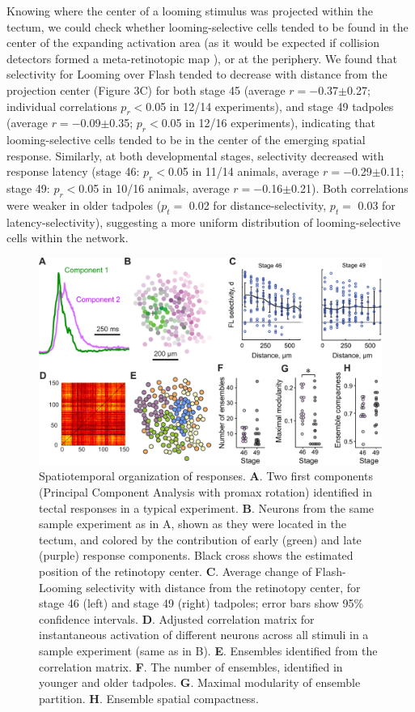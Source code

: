 \documentclass{article}
\begin{document}
Knowing where the center of a looming stimulus was projected within the tectum, we could check whether looming-selective cells tended to be found in the center of the expanding activation area (as it would be expected if collision detectors formed a meta-retinotopic map \citep{frost2004review}), or at the periphery. We found that selectivity for Looming over Flash tended to decrease with distance from the projection center (Figure 3C) for both stage 45 (average $r=-$0.37$\pm$0.27; individual correlations $p_r<$0.05 in 12/14 experiments), and stage 49 tadpoles (average $r=-$0.09$\pm$0.35; $p_r<$0.05 in 12/16 experiments), indicating that looming-selective cells tended to be in the center of the emerging spatial response. Similarly, at both developmental stages, selectivity decreased with response latency (stage 46: $p_r<$0.05 in 11/14 animals, average $r=-$0.29$\pm$0.11; stage 49: $p_r<$0.05 in 10/16 animals, average $r=-$0.16$\pm$0.21). Both correlations were weaker in older tadpoles ($p_t=$ 0.02 for distance-selectivity, $p_t=$ 0.03 for latency-selectivity), suggesting a more uniform distribution of looming-selective cells within the network.

\begin{figure}[t!]
\includegraphics[width=\linewidth]{fig3.pdf}
\caption{
Spatiotemporal organization of responses. \textbf{A}. Two first components (Principal Component Analysis with promax rotation) identified in tectal responses in a typical experiment.  \textbf{B}. Neurons from the same sample experiment as in A, shown as they were located in the tectum, and colored by the contribution of early (green) and late (purple) response components. Black cross shows the estimated position of the retinotopy center. \textbf{C}. Average change of Flash-Looming selectivity with distance from the retinotopy center, for stage 46 (left) and stage 49 (right) tadpoles; error bars show 95\% confidence intervals. \textbf{D}. Adjusted correlation matrix for instantaneous activation of different neurons across all stimuli in a sample experiment (same as in B). \textbf{E}. Ensembles identified from the correlation matrix. \textbf{F}. The number of ensembles, identified in younger and older tadpoles. \textbf{G}. Maximal modularity of ensemble partition. \textbf{H}. Ensemble spatial compactness.}
\end{figure}
\end{document}
